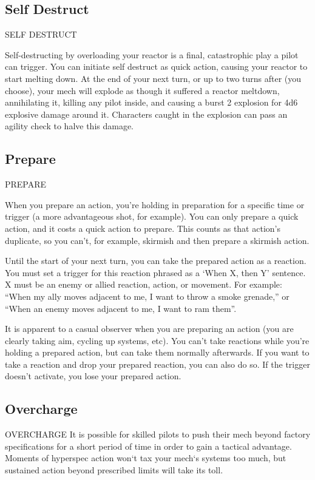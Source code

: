 \subsection{Self Destruct}
                                          SELF DESTRUCT

Self-destructing by overloading your reactor is a final, catastrophic play a pilot can trigger. You
can initiate self destruct as quick action, causing your reactor to start melting down. At the end
of your next turn, or up to two turns after (you choose), your mech will explode as though it
suffered a reactor meltdown, annihilating it, killing any pilot inside, and causing a burst 2
explosion for 4d6 explosive damage around it. Characters caught in the explosion can pass an
agility check to halve this damage.
\subsection{Prepare}
                                                PREPARE

When you prepare an action, you’re holding in preparation for a specific time or trigger (a more
advantageous shot, for example). You can only prepare a quick action, and it costs a quick
action to prepare. This counts as that action’s duplicate, so you can’t, for example, skirmish and
then prepare a skirmish action.


Until the start of your next turn, you can take the prepared action as a reaction. You must set a
trigger for this reaction phrased as a ‘When X, then Y’ sentence. X must be an enemy or allied
reaction, action, or movement. For example: “When my ally moves adjacent to me, I want to
throw a smoke grenade,” or “When an enemy moves adjacent to me, I want to ram them”.


It is apparent to a casual observer when you are preparing an action (you are clearly taking aim,
cycling up systems, etc). You can’t take reactions while you’re holding a prepared action, but can
take them normally afterwards. If you want to take a reaction and drop your prepared reaction,
you can also do so. If the trigger doesn’t activate, you lose your prepared action.

\subsection{Overcharge}
                                            OVERCHARGE
It is possible for skilled pilots to push their mech beyond factory specifications for a short period
of time in order to gain a tactical advantage. Moments of hyperspec action won‘t tax your
mech‘s systems too much, but sustained action beyond prescribed limits will take its toll.





